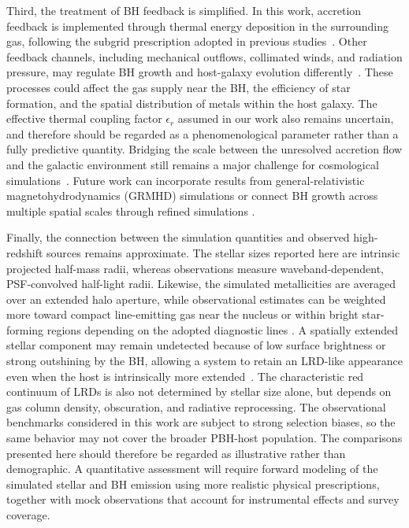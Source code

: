 \documentclass[twocolumn,trackchanges]{aastex701}
\begin{document}
Third, the treatment of BH feedback is simplified. In this work, accretion feedback is implemented through thermal energy deposition in the surrounding gas, following the subgrid prescription adopted in previous studies~\citep{tremmel2017romulus}. Other feedback channels, including mechanical outflows, collimated winds, and radiation pressure, may regulate BH growth and host-galaxy evolution differently~\citep[see the review by][]{Inayoshi:2020}. These processes could affect the gas supply near the BH, the efficiency of star formation, and the spatial distribution of metals within the host galaxy. The effective thermal coupling factor $\epsilon_r$ assumed in our work also remains uncertain, and therefore should be regarded as a phenomenological parameter rather than a fully predictive quantity. Bridging the scale between the unresolved accretion flow and the galactic environment still remains a major challenge for cosmological simulations~\citep{2021ApJ...917...53A}. Future work can incorporate results from general-relativistic magnetohydrodynamics (GRMHD) simulations or connect BH growth across multiple spatial scales through refined simulations \citep[e.g.,][]{Hopkins2024OJAp....7E..18H,ChoScales2026ApJ, SuScales2026ApJ...998L..18S}.


Finally, the connection between the simulation quantities and observed high-redshift sources remains approximate. The stellar sizes reported here are intrinsic projected half-mass radii, whereas observations measure waveband-dependent, PSF-convolved half-light radii. Likewise, the simulated metallicities are averaged over an extended halo aperture, while observational estimates can be weighted more toward compact line-emitting gas near the nucleus or within bright star-forming regions depending on the adopted diagnostic lines \citep[e.g.,][]{Martinez2025,Miao2026,Moreschini2026}. A spatially extended stellar component may remain undetected because of low surface brightness or strong outshining by the BH, allowing a system to retain an LRD-like appearance even when the host is intrinsically more extended~\citep{Rinaldi2026ApJLRD}. The characteristic red continuum of LRDs is also not determined by stellar size alone, but depends on gas column density, obscuration, and radiative reprocessing. The observational benchmarks considered in this work are subject to strong selection biases, so the same behavior may not cover the broader PBH-host population. The comparisons presented here should therefore be regarded as illustrative rather than demographic. A quantitative assessment will require forward modeling of the simulated stellar and BH emission using more realistic physical prescriptions, together with mock observations that account for instrumental effects and survey coverage.
\end{document}
